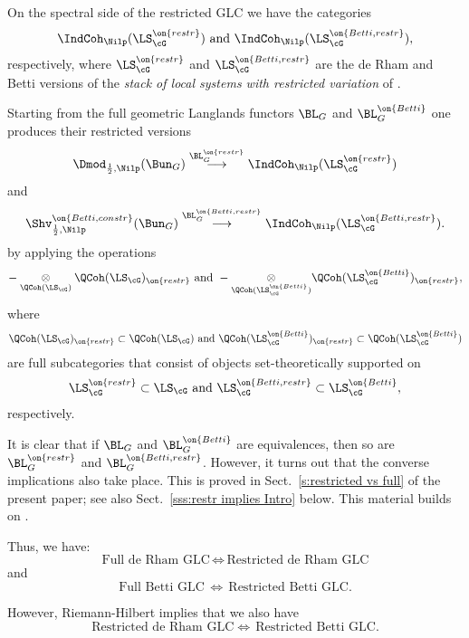 \documentclass[9pt]{amsart}
\theoremstyle{remark}
\theoremstyle{definition}
\theoremstyle{remark}
\newcommand{\secref}[1]{Sect.~\ref{#1}}
\numberwithin{equation}{section}
\begin{document}
\sssec{}

On the spectral side of the restricted GLC we have the categories 
\begin{equation} \label{e:spectral side restr Intro}
\IndCoh_\Nilp(\LS^{\on{restr}}_\cG) \text{ and } \IndCoh_\Nilp(\LS^{\on{Betti,restr}}_\cG),
\end{equation} 
respectively, where $\LS^{\on{restr}}_\cG$ and $\LS^{\on{Betti,restr}}_\cG$ are the de Rham and Betti 
versions of the \emph{stack of local systems with restricted variation} of \cite[Sect. 1.4]{AGKRRV}. 

\sssec{}

Starting from the full geometric Langlands functors $\BL_G$ and $\BL_G^{\on{Betti}}$ one produces their 
restricted versions
$$\Dmod_{\frac{1}{2},\Nilp}(\Bun_G) \overset{\BL_G^{\on{restr}}}\longrightarrow \IndCoh_\Nilp(\LS^{\on{restr}}_\cG)$$
and 
$$\Shv^{\on{Betti,constr}}_{\frac{1}{2},\Nilp}(\Bun_G) \overset{\BL_G^{\on{Betti,restr}}}\longrightarrow \IndCoh_\Nilp(\LS^{\on{Betti,restr}}_\cG).$$
by applying the operations
$$-\underset{\QCoh(\LS_\cG)}\otimes \QCoh(\LS_\cG)_{\on{restr}} \text{ and }
-\underset{\QCoh(\LS^{\on{Betti}}_\cG)}\otimes \QCoh(\LS^{\on{Betti}}_\cG)_{\on{restr}},$$
where
$$ \QCoh(\LS_\cG)_{\on{restr}} \subset \QCoh(\LS_\cG) \text{ and }
\QCoh(\LS^{\on{Betti}}_\cG)_{\on{restr}} \subset \QCoh(\LS^{\on{Betti}}_\cG)$$
are full subcategories that consist of objects set-theoretically supported on
$$\LS^{\on{restr}}_\cG\subset \LS_\cG \text{ and } \LS^{\on{Betti,restr}}_\cG\subset \LS^{\on{Betti}}_\cG,$$
respectively. 

\medskip

It is clear that if $\BL_G$ and $\BL_G^{\on{Betti}}$ are equivalences, then so are $\BL_G^{\on{restr}}$ and
$\BL_G^{\on{Betti,restr}}$. However, it turns out that the converse implications also take place.
This is proved in \secref{s:restricted vs full} of the present paper; see also \secref{sss:restr implies Intro} below. This material builds on 
\cite[Sect. 21.4]{AGKRRV}.

\sssec{}

Thus, we have:
$$\text{Full de Rham GLC}\, \Leftrightarrow\, \text{Restricted de Rham GLC}$$
and  
$$\text{Full Betti GLC}\, \Leftrightarrow\, \text{Restricted Betti GLC}.$$ 

\medskip

However, Riemann-Hilbert implies that we also have
$$\text{Restricted de Rham GLC}  \Leftrightarrow\, \text{Restricted Betti GLC}.$$
\end{document}
